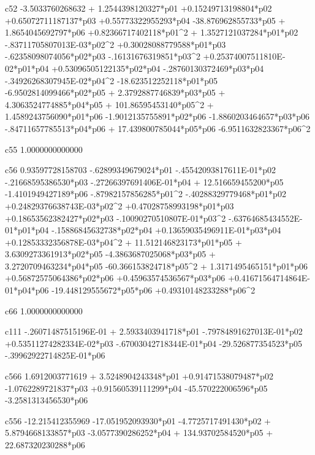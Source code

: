  c52
  -3.5033760268632 + 1.2544398120327*p01 +0.15249713198804*p02 +0.65072711187137*p03 +0.55773322955293*p04  -38.876962855733*p05 + 1.8654045692797*p06 +0.82366717402118*p01^2 + 1.3527121037284*p01*p02  -.83711705807013E-03*p02^2 +0.30028088779588*p01*p03  -.62358098074056*p02*p03  -.16131676319851*p03^2 +0.25374007511810E-02*p01*p04 +0.53096505122135*p02*p04  -.28760130372469*p03*p04  -.34926268307945E-02*p04^2  -18.623512252118*p01*p05  -6.9502814099466*p02*p05 + 2.3792887746839*p03*p05 + 4.3063524774885*p04*p05 + 101.86595453140*p05^2 + 1.4589243756090*p01*p06  -1.9012135755891*p02*p06  -1.8860203464657*p03*p06  -.84711657785513*p04*p06 + 17.439800785044*p05*p06  -6.9511632823367*p06^2 
  
 c55
   1.0000000000000 
  
 c56
  0.93597728158703  -.62899349679024*p01  -.45542093817611E-01*p02  -.21668595386530*p03  -.27266397691406E-01*p04 + 12.516659455200*p05  -1.4101949427189*p06  -.87982157856285*p01^2  -.40288329779468*p01*p02 +0.24829376638743E-03*p02^2 +0.47028758993198*p01*p03 +0.18653562382427*p02*p03  -.10090270510807E-01*p03^2  -.63764685434552E-01*p01*p04  -.15886845632738*p02*p04 +0.13659035496911E-01*p03*p04 +0.12853332356878E-03*p04^2 + 11.512146823173*p01*p05 + 3.6309273361913*p02*p05  -4.3863687025068*p03*p05 + 3.2720709463234*p04*p05  -60.366153824718*p05^2 + 1.3171495465151*p01*p06 +0.56872575064386*p02*p06 +0.45963574536567*p03*p06 +0.41671564714864E-01*p04*p06  -19.448129555672*p05*p06 +0.49310148233288*p06^2 
  
 c66
   1.0000000000000 
  
 c111
  -.26071487515196E-01 + 2.5933403941718*p01  -.79784891627013E-01*p02 +0.53511274282334E-02*p03  -.67003042718344E-01*p04  -29.526877354523*p05  -.39962922714825E-01*p06 
  
 c566
   1.6912003771619 + 3.5248904243348*p01 +0.91471538079487*p02  -1.0762289721837*p03 +0.91560539111299*p04  -45.570222006596*p05  -3.2581313456530*p06 
  
 c556
  -12.215412355969  -17.051952093930*p01  -4.7725717491430*p02 + 5.8794668133857*p03  -3.0577390286252*p04 + 134.93702584520*p05 + 22.687320230288*p06 
  
